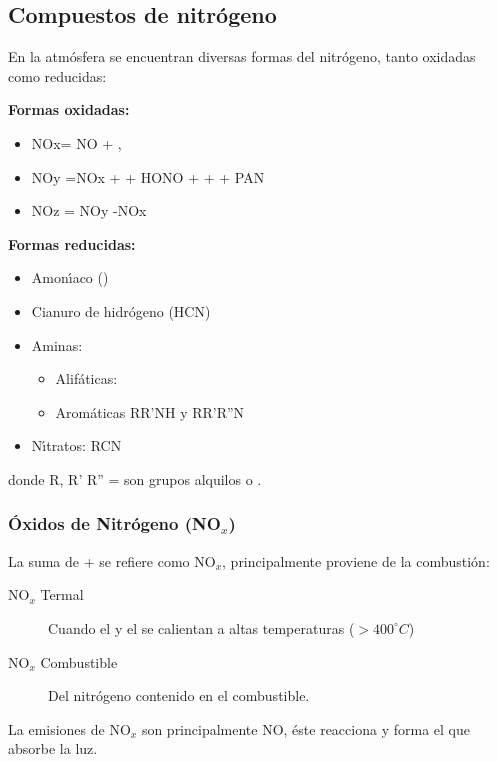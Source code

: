 \subsection{Compuestos de nitrógeno}
En la atmósfera se encuentran diversas formas del nitrógeno, tanto oxidadas como reducidas:

\textbf{Formas oxidadas:}
\begin{itemize}
\item NOx= NO + ,
\item NOy =NOx +  + HONO +  +  + PAN
\item NOz = NOy -NOx
\end{itemize}

\textbf{Formas reducidas:}
\begin{itemize}
\item  Amon\'{\i}aco ()
\item Cianuro de hidrógeno (HCN) 
\item Aminas:
\begin{itemize}
\item Alifáticas:  
\item Aromáticas  RR'NH y RR'R''N 
\end{itemize}
\item N\'{\i}tratos: RCN
\end{itemize}
 donde R, R' R'' = son grupos alquilos  o  .

\subsubsection{\'Oxidos de Nitr\'ogeno (NO$_x$)}
La suma de  +  se refiere como NO$_x$, principalmente proviene de la combusti\'on:
\begin{description}
\item[NO$_x$ Termal] Cuando el   y el  se calientan a altas temperaturas
($>400^\circ C$)
\item[NO$_x$ Combustible] Del nitr\'ogeno contenido en el combustible.
\end{description}
La emisiones de NO$_x$ son principalmente NO, \'este reacciona y forma el  que absorbe la luz.


